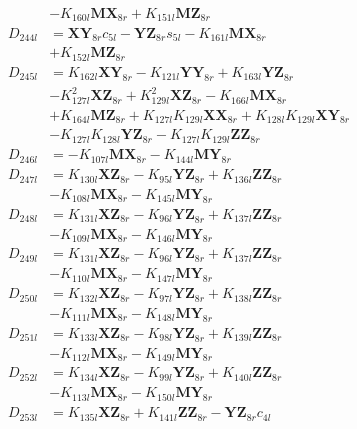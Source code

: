 \begin{align}
&- K_{160l}\mathbf{MX}_{8r} + K_{151l}\mathbf{MZ}_{8r} \nonumber \\
D_{244l} &= \mathbf{XY}_{8r}c_{5l} - \mathbf{YZ}_{8r}s_{5l} - K_{161l}\mathbf{MX}_{8r}  \nonumber \\
&+ K_{152l}\mathbf{MZ}_{8r} \nonumber \\
D_{245l} &= K_{162l}\mathbf{XY}_{8r} - K_{121l}\mathbf{YY}_{8r} + K_{163l}\mathbf{YZ}_{8r}  \nonumber \\
&- K_{127l}^2\mathbf{XZ}_{8r} + K_{129l}^2\mathbf{XZ}_{8r} - K_{166l}\mathbf{MX}_{8r}  \nonumber \\
&+ K_{164l}\mathbf{MZ}_{8r} + K_{127l}K_{129l}\mathbf{XX}_{8r} + K_{128l}K_{129l}\mathbf{XY}_{8r}  \nonumber \\
&- K_{127l}K_{128l}\mathbf{YZ}_{8r} - K_{127l}K_{129l}\mathbf{ZZ}_{8r} \nonumber \\
D_{246l} &= - K_{107l}\mathbf{MX}_{8r} - K_{144l}\mathbf{MY}_{8r} \nonumber \\
D_{247l} &= K_{130l}\mathbf{XZ}_{8r} - K_{95l}\mathbf{YZ}_{8r} + K_{136l}\mathbf{ZZ}_{8r}  \nonumber \\
&- K_{108l}\mathbf{MX}_{8r} - K_{145l}\mathbf{MY}_{8r} \nonumber \\
D_{248l} &= K_{131l}\mathbf{XZ}_{8r} - K_{96l}\mathbf{YZ}_{8r} + K_{137l}\mathbf{ZZ}_{8r}  \nonumber \\
&- K_{109l}\mathbf{MX}_{8r} - K_{146l}\mathbf{MY}_{8r} \nonumber \\
D_{249l} &= K_{131l}\mathbf{XZ}_{8r} - K_{96l}\mathbf{YZ}_{8r} + K_{137l}\mathbf{ZZ}_{8r}  \nonumber \\
&- K_{110l}\mathbf{MX}_{8r} - K_{147l}\mathbf{MY}_{8r} \nonumber \\
D_{250l} &= K_{132l}\mathbf{XZ}_{8r} - K_{97l}\mathbf{YZ}_{8r} + K_{138l}\mathbf{ZZ}_{8r}  \nonumber \\
&- K_{111l}\mathbf{MX}_{8r} - K_{148l}\mathbf{MY}_{8r} \nonumber \\
D_{251l} &= K_{133l}\mathbf{XZ}_{8r} - K_{98l}\mathbf{YZ}_{8r} + K_{139l}\mathbf{ZZ}_{8r}  \nonumber \\
&- K_{112l}\mathbf{MX}_{8r} - K_{149l}\mathbf{MY}_{8r} \nonumber \\
D_{252l} &= K_{134l}\mathbf{XZ}_{8r} - K_{99l}\mathbf{YZ}_{8r} + K_{140l}\mathbf{ZZ}_{8r}  \nonumber \\
&- K_{113l}\mathbf{MX}_{8r} - K_{150l}\mathbf{MY}_{8r} \nonumber \\
D_{253l} &= K_{135l}\mathbf{XZ}_{8r} + K_{141l}\mathbf{ZZ}_{8r} - \mathbf{YZ}_{8r}c_{4l}  \nonumber \\

\end{align}
